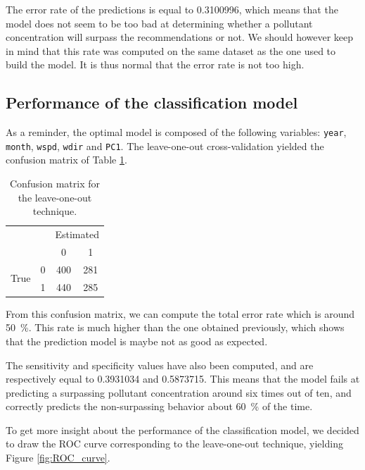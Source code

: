 \documentclass[a4paper, 12pt]{article}
\begin{document}
	The error rate of the predictions is equal to \num{0.3100996}, which means that the model does not seem to be too bad at determining whether a pollutant concentration will surpass the recommendations or not. We should however keep in mind that this rate was computed on the same dataset as the one used to build the model. It is thus normal that the error rate is not too high. 
	
	\subsection{Performance of the classification model}
    As a reminder, the optimal model is composed of the following variables: \texttt{year}, \texttt{month}, \texttt{wspd}, \texttt{wdir} and \texttt{PC1}. The leave-one-out cross-validation yielded the confusion matrix of Table \ref{tab:leave_one_out}.
    \begin{table}[h]
    \centering
    \begin{tabular}{cc|cc}
                                &   & \multicolumn{2}{c}{Estimated} \\
                                &   & 0                 & 1               \\ \hline
    \multirow{2}{*}{True} & 0 & 400               & 281             \\
                                & 1 & 440               & 285             
    \end{tabular}
    \caption{Confusion matrix for the leave-one-out technique.}
    \label{tab:leave_one_out}
    \end{table}
    From this confusion matrix, we can compute the total error rate which is around \SI{50}{\percent}. This rate is much higher than the one obtained previously, which shows that the prediction model is maybe not as good as expected. 
    
    The sensitivity and specificity values have also been computed, and are respectively equal to \num{0.3931034} and \num{0.5873715}. This means that the model fails at predicting a surpassing pollutant concentration around six times out of ten, and correctly predicts the non-surpassing behavior about \SI{60}{\percent} of the time.
    
    To get more insight about the performance of the classification model, we decided to draw the ROC curve corresponding to the leave-one-out technique, yielding Figure \ref{fig:ROC_curve}.
    
\end{document}
